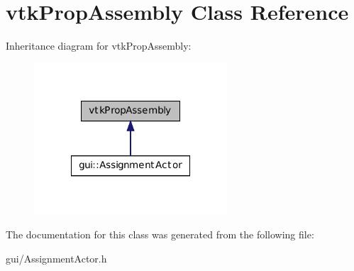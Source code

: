 \hypertarget{classvtk_prop_assembly}{
\section{vtkPropAssembly Class Reference}
\label{classvtk_prop_assembly}
}


Inheritance diagram for vtkPropAssembly:\nopagebreak
\begin{figure}[H]
\begin{center}
\leavevmode
\includegraphics[width=204pt]{classvtk_prop_assembly__inherit__graph}
\end{center}
\end{figure}


The documentation for this class was generated from the following file:\begin{DoxyCompactItemize}
\item 
gui/AssignmentActor.h\end{DoxyCompactItemize}
